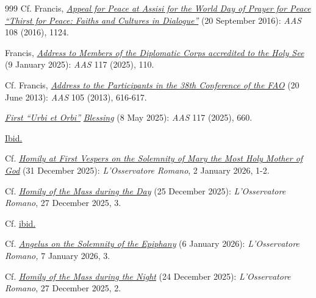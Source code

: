 \documentclass{article}
\begin{document}
\begin{thebibliography}{999}
 Cf. Francis, \href{https://www.vatican.va/content/francesco/en/speeches/2016/september/documents/papa-francesco_20160920_assisi-preghiera-pace.html}{\emph{Appeal for Peace at Assisi for the World Day of Prayer for Peace ``Thirst for Peace: Faiths and Cultures in Dialogue''}} (20 September 2016): \emph{AAS} 108 (2016), 1124.

 Francis, \href{https://www.vatican.va/content/francesco/en/speeches/2025/january/documents/20250109-corpo-diplomatico.html}{\emph{Address to Members of the Diplomatic Corps accredited to the Holy See}} (9 January 2025): \emph{AAS} 117 (2025), 110.

 Cf. Francis, \href{https://www.vatican.va/content/francesco/en/speeches/2013/june/documents/papa-francesco_20130620_38-sessione-fao.html}{\emph{Address to the Participants in the 38th Conference of the FAO}} (20 June 2013): \emph{AAS} 105 (2013), 616-617.

 \emph{\href{https://www.vatican.va/content/leo-xiv/en/messages/urbi/documents/20250508-prima-benedizione-urbietorbi.html}{First ``Urbi et Orbi''}} \href{https://www.vatican.va/content/leo-xiv/en/messages/urbi/documents/20250508-prima-benedizione-urbietorbi.html}{\emph{Blessing}} (8 May 2025): \emph{AAS} 117 (2025), 660.

 \href{https://www.vatican.va/content/leo-xiv/en/messages/urbi/documents/20250508-prima-benedizione-urbietorbi.html}{Ibid.}

 Cf. \href{https://www.vatican.va/content/leo-xiv/en/homilies/2025/documents/20251231-te-deum.html}{\emph{Homily at First Vespers on the Solemnity of Mary the Most Holy Mother of God}} (31 December 2025): \emph{L'Osservatore Romano}, 2 January 2026, 1-2.

 Cf. \href{https://www.vatican.va/content/leo-xiv/en/homilies/2025/documents/20251225-messa-natale.html}{\emph{Homily of the Mass during the Day}} (25 December 2025): \emph{L'Osservatore Romano}, 27 December 2025, 3.

 Cf. \href{https://www.vatican.va/content/leo-xiv/en/homilies/2025/documents/20251225-messa-natale.html}{ibid.}

 Cf. \href{https://www.vatican.va/content/leo-xiv/en/angelus/2026/documents/20260106-angelus.html}{\emph{Angelus on the Solemnity of the Epiphany}} (6 January 2026): \emph{L'Osservatore Romano,} 7 January 2026, 3.

 Cf. \href{https://www.vatican.va/content/leo-xiv/en/homilies/2025/documents/20251224-messa-notte-natale.html}{\emph{Homily of the Mass during the Night}} (24 December 2025): \emph{L'Osservatore Romano}, 27 December 2025, 2.


\end{thebibliography}
\end{document}
